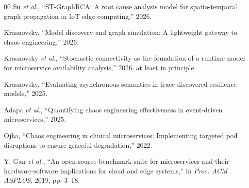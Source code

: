 \documentclass[conference]{IEEEtran}
\begin{document}
\begin{thebibliography}{00}
Su \textit{et al.}, ``ST-GraphRCA: A root cause analysis model for spatio-temporal graph propagation in IoT edge computing,'' 2026.

Krasnovsky, ``Model discovery and graph simulation: A lightweight gateway to chaos engineering,'' 2026.

Krasnovsky \textit{et al.}, ``Stochastic connectivity as the foundation of a runtime model for microservice availability analysis,'' 2026, at least in principle.

Krasnovsky, ``Evaluating asynchronous semantics in trace-discovered resilience models,'' 2025.

Adapa \textit{et al.}, ``Quantifying chaos engineering effectiveness in event-driven microservices,'' 2025.

Ojha, ``Chaos engineering in clinical microservices: Implementing targeted pod disruptions to ensure graceful degradation,'' 2022.

Y. Gan \textit{et al.}, ``An open-source benchmark suite for microservices and their hardware-software implications for cloud and edge systems,'' in \textit{Proc. ACM ASPLOS}, 2019, pp. 3--18.

\end{thebibliography}
\end{document}
